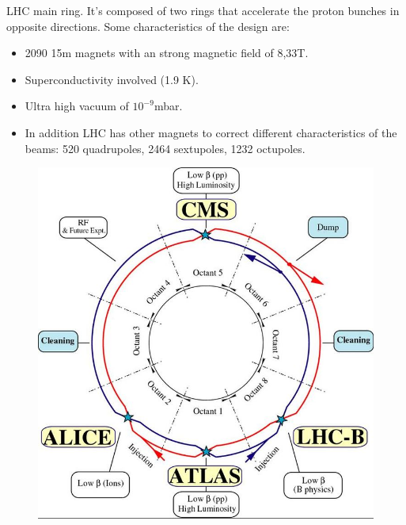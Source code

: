 \documentclass[8pt]{beamer}
\begin{document}
\begin{frame}[fragile]{LHC main ring.}
	It's composed of two rings that accelerate the proton bunches in opposite directions. Some characteristics of the design are:
	\begin{itemize}
		\item 2090 15m magnets with an strong magnetic field of 8,33T. 
		\item Superconductivity involved (1.9 K).
		\item Ultra high vacuum of $10^{-9}$mbar.
		\item In addition LHC has other magnets to correct different characteristics of the beams: 520 quadrupoles, 2464 sextupoles, 1232 octupoles.
	\end{itemize}
	
	\begin{figure}[!tbp]
		\centering
		\begin{minipage}[b]{0.4\textwidth}
			\includegraphics[width=\textwidth]{3}
			

\end{minipage}
\end{figure}
\end{frame}
\end{document}
